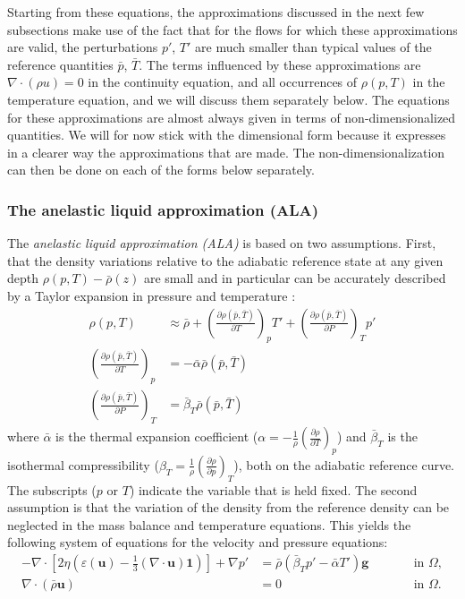 \documentclass{article}
\begin{document}
Starting from these equations, the approximations discussed in the next few
subsections make use of the fact that for the flows for which these approximations are valid, the
perturbations $p'$, $T'$ are much smaller than typical values of the reference
quantities $\bar p$, $\bar T$. 
The terms influenced by these approximations are $\nabla \cdot (\rho u) =0$ in the 
continuity equation, and all occurrences of $\rho(p,T)$ in the temperature equation, 
and we will discuss them separately below. The equations for these approximations are
almost always given in terms of non-dimensionalized quantities. We will for
now stick with the dimensional form because it expresses in a clearer way the
approximations that are made. The non-dimensionalization can then be done on
each of the forms below separately.

\subsubsection{The anelastic liquid approximation (ALA)}
\label{sec:ala}

The \textit{anelastic liquid approximation (ALA)} is based on two assumptions.
First, that the density variations relative to the adiabatic reference state at
any given depth $\rho(p,T)-\bar\rho (z)$ are small and in particular can be
accurately described by a Taylor expansion in pressure and temperature \cite{STO01}:
\begin{align}
  \rho(p,T) &\approx
  \bar\rho 
  + \left( \frac{\partial \rho(\bar p,\bar T)}{\partial T} \right)_{p} T' 
  + \left( \frac{\partial \rho(\bar p,\bar T)}{\partial P} \right)_{T} p' \\
  \left( \frac{\partial \rho(\bar p,\bar T)}{\partial T} \right)_{p} &= -\bar \alpha \bar \rho(\bar p,\bar T) \\
  \left( \frac{\partial \rho(\bar p,\bar T)}{\partial P} \right)_{T} &= \bar \beta_T \bar \rho(\bar p,\bar T)
\end{align}
where $\bar \alpha$ is the thermal expansion coefficient
($\alpha = -\frac{1}{\rho}\left(\frac{\partial \rho}{\partial T}\right)_p$) and $\bar \beta_T$ is
the isothermal compressibility
($\beta_T = \frac{1}{\rho}\left(\frac{\partial \rho}{\partial p}\right)_T$),
both on the adiabatic reference curve. The
subscripts ($p$ or $T$) indicate the variable that is held fixed.
The second assumption is that the variation of the density from the reference
density can be neglected in the mass balance and temperature equations.
This yields the following system of equations for the velocity and pressure
equations:
\begin{align}
  \label{eq:stokes-ALA-1}
  -\nabla \cdot \left[2\eta \left(\varepsilon(\mathbf u)
                                  - \frac{1}{3}(\nabla \cdot \mathbf u)\mathbf 1\right)
                \right] + \nabla p' &=
  \bar \rho \left(\bar \beta_T p' - \bar \alpha T' \right) \mathbf g
  & \qquad
  & \textrm{in $\Omega$},
  \\
  \label{eq:stokes-ALA-2}
  \nabla \cdot (\bar\rho \mathbf u) &= 0
  & \qquad
  & \textrm{in $\Omega$}.
\end{align}
\end{document}
